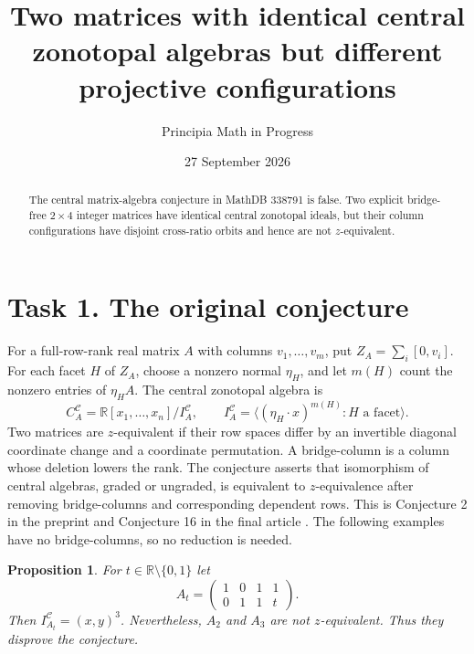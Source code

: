 \documentclass[11pt]{article}
\title{Two matrices with identical central zonotopal algebras\newline
but different projective configurations}
\author{Principia Math in Progress}
\date{27 September 2026}
\newtheorem{proposition}{Proposition}
\newcommand{\R}{\mathbb R}
\begin{document}
\maketitle
\begin{abstract}
The central matrix-algebra conjecture in MathDB 338791 is false.
Two explicit bridge-free $2\times4$ integer matrices have identical central
zonotopal ideals, but their column configurations have disjoint cross-ratio
orbits and hence are not $z$-equivalent.
\end{abstract}

\section*{Task 1. The original conjecture}
For a full-row-rank real matrix $A$ with columns $v_1,\ldots,v_m$, put
$Z_A=\sum_i[0,v_i]$. For each facet $H$ of $Z_A$, choose a nonzero normal
$\eta_H$, and let $m(H)$ count the nonzero entries of $\eta_H A$.
The central zonotopal algebra is
\[
 C_A^{\mathcal C}=\R[x_1,\ldots,x_n]/I_A^{\mathcal C},\qquad
 I_A^{\mathcal C}=\langle(\eta_H\cdot x)^{m(H)}:H\text{ a facet}\rangle.
\]
Two matrices are $z$-equivalent if their row spaces differ by an invertible
diagonal coordinate change and a coordinate permutation. A bridge-column
is a column whose deletion lowers the rank. The conjecture asserts that
isomorphism of central algebras, graded or ungraded, is equivalent to
$z$-equivalence after removing bridge-columns and corresponding dependent
rows. This is Conjecture 2 in the preprint and Conjecture 16 in the final
article \cite{N}. The following examples have no bridge-columns, so no
reduction is needed.

\begin{proposition}
For $t\in\R\setminus\{0,1\}$ let
\[
 A_t=\begin{pmatrix}1&0&1&1\\0&1&1&t\end{pmatrix}.
\]
Then $I_{A_t}^{\mathcal C}=(x,y)^3$. Nevertheless, $A_2$ and $A_3$ are not
$z$-equivalent. Thus they disprove the conjecture.
\end{proposition}
\end{document}

